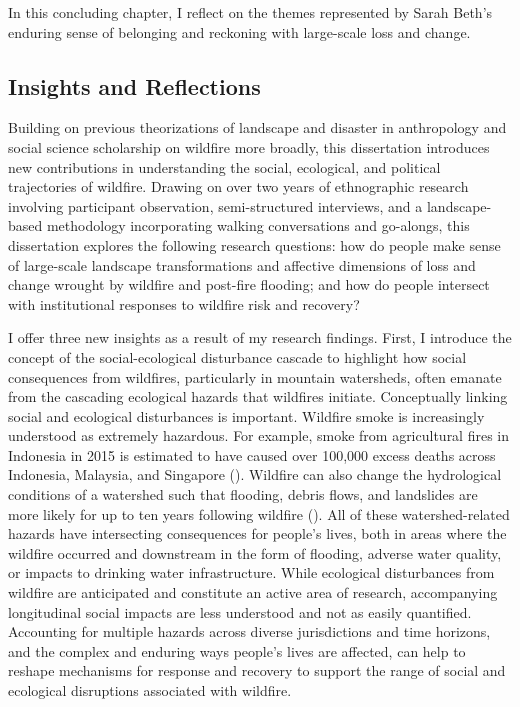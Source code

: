\documentclass[
]{article}
\begin{document}
In this concluding chapter, I reflect on the themes represented by Sarah Beth's enduring sense of belonging and reckoning with large-scale loss and change.

\subsection{Insights and Reflections}\label{insights-and-reflections}

Building on previous theorizations of landscape and disaster in anthropology and social science scholarship on wildfire more broadly, this dissertation introduces new contributions in understanding the social, ecological, and political trajectories of wildfire. Drawing on over two years of ethnographic research involving participant observation, semi-structured interviews, and a landscape-based methodology incorporating walking conversations and go-alongs, this dissertation explores the following research questions: how do people make sense of large-scale landscape transformations and affective dimensions of loss and change wrought by wildfire and post-fire flooding; and how do people intersect with institutional responses to wildfire risk and recovery?

I offer three new insights as a result of my research findings. First, I introduce the concept of the social-ecological disturbance cascade to highlight how social consequences from wildfires, particularly in mountain watersheds, often emanate from the cascading ecological hazards that wildfires initiate. Conceptually linking social and ecological disturbances is important. Wildfire smoke is increasingly understood as extremely hazardous. For example, smoke from agricultural fires in Indonesia in 2015 is estimated to have caused over 100,000 excess deaths across Indonesia, Malaysia, and Singapore (). Wildfire can also change the hydrological conditions of a watershed such that flooding, debris flows, and landslides are more likely for up to ten years following wildfire (). All of these watershed-related hazards have intersecting consequences for people's lives, both in areas where the wildfire occurred and downstream in the form of flooding, adverse water quality, or impacts to drinking water infrastructure. While ecological disturbances from wildfire are anticipated and constitute an active area of research, accompanying longitudinal social impacts are less understood and not as easily quantified. Accounting for multiple hazards across diverse jurisdictions and time horizons, and the complex and enduring ways people's lives are affected, can help to reshape mechanisms for response and recovery to support the range of social and ecological disruptions associated with wildfire.
\end{document}
